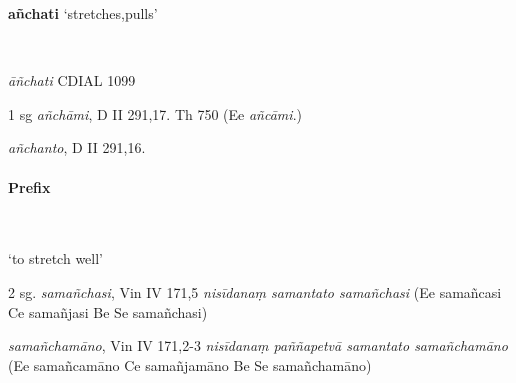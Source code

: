 \documentclass[11pt]{article}
\newcommand*\ṛ{r\symbol{"325}}
\newcommand*\Ṛ{R\symbol{"325}}
\newcommand*\ṝ{r\symbol{"304}\symbol{"325}}
\newcommand*\Ṝ{R\symbol{"304}\symbol{"325}}
\newcommand*\ḷ{l\symbol{"325}}
\newcommand*\ḹ{l\symbol{"304}\symbol{"325}}
\newcommand*\Ḷ{L\symbol{"325}}
\newcommand*\Ḹ{L\symbol{"304}\symbol{"325}}
\begin{document}
%
%
%
%

%
%
\begin{center}
{\Large
\textbf{añchati} `stretches,pulls'
}
\end{center}
\
\begin{description}[leftmargin=\parindent]
\item[ety.] \textit{āñchati}
CDIAL 1099
\end{description}

\begin{description}[leftmargin=\parindent]
\item[pres.] 1 sg \textit{añchāmi}, D II 291,17.
Th 750 (Ee \textit{añcāmi}.)
\item[par. pres.] \textit{añchanto}, D II 291,16.
\end{description}

\paragraph*{Prefix}\mbox{}\\
\begin{description}[leftmargin=\parindent] 
\item[sam-] `to stretch well'
\item[pres.] 2 sg. \textit{samañchasi}, Vin IV 171,5  \textit{nisīdanaṃ samantato samañchasi} (Ee samañcasi Ce samañjasi Be Se samañchasi)
\item[part.pres.] \textit{samañchamāno}, Vin IV 171,2-3 \textit{nisīdanaṃ paññapetvā samantato samañchamāno} (Ee samañcamāno Ce samañjamāno Be Se samañchamāno)
\end{description}
\end{document}
